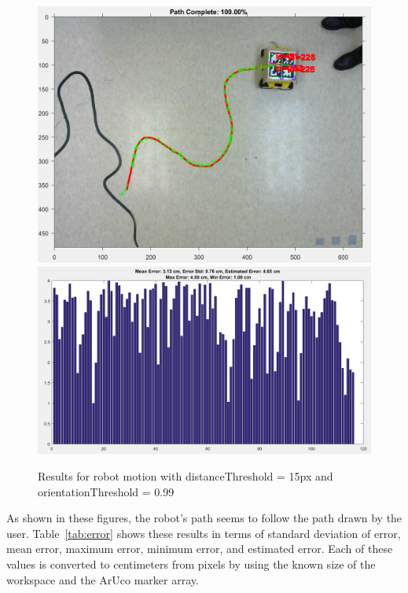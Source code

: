 \documentclass[12pt,american]{report}
\begin{document}
\begin{figure}[h!]
\centering
\includegraphics[scale=.25]{images/PATH-1599.PNG}
\includegraphics[scale=.25]{images/DATA-1599.PNG}
\caption{Results for robot motion with distanceThreshold = 15px and orientationThreshold = 0.99}
\label{fig:results3}
\end{figure}

As shown in these figures, the robot's path seems to follow the path drawn by the user.  Table~\ref{tab:error} shows these results in terms of standard deviation of error, mean error, maximum error, minimum error, and estimated error. Each of these values is converted to centimeters from pixels by using the known size of the workspace and the ArUco marker array.
\end{document}
